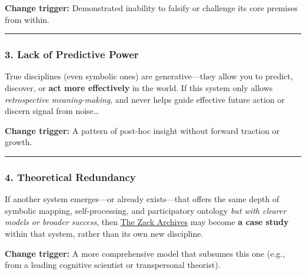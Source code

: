 \documentclass{article}
\begin{document}
\textbf{Change trigger:} Demonstrated inability to falsify or challenge its core premises from within.

\begin{center}\rule{0.5\linewidth}{0.5pt}\end{center}

\subsubsection*{\texorpdfstring{\textbf{3. Lack of Predictive Power}}{3. Lack of Predictive Power}}\label{lack-of-predictive-power}

True disciplines (even symbolic ones) are generative---they allow you to predict, discover, or \textbf{act more effectively} in the world. If this system only allows \emph{retrospective meaning-making}, and never helps guide effective future action or discern signal from noise\ldots{}

\textbf{Change trigger:} A pattern of post-hoc insight without forward traction or growth.

\begin{center}\rule{0.5\linewidth}{0.5pt}\end{center}

\subsubsection*{}\label{section-10}

\subsubsection*{\texorpdfstring{\textbf{4. Theoretical Redundancy}}{4. Theoretical Redundancy}}\label{theoretical-redundancy}

If another system emerges---or already exists---that offers the same depth of symbolic mapping, self-processing, and participatory ontology \emph{but with clearer models or broader success}, then \hyperlink{gloss:the_zack_archives}{The Zack Archives} may become \textbf{a case study} within that system, rather than its own new discipline.

\textbf{Change trigger:} A more comprehensive model that subsumes this one (e.g., from a leading cognitive scientist or transpersonal theorist).
\end{document}
